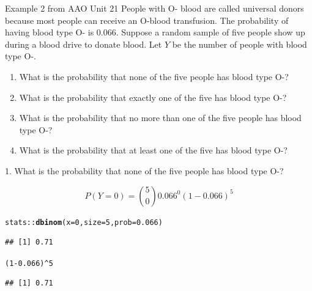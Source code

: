\documentclass[10pt,handout]{beamer}\usepackage[]{graphicx}\usepackage[]{color}
\makeatletter
\newcommand{\hlnum}[1]{\textcolor[rgb]{0.686,0.059,0.569}{#1}}%
\newcommand{\hlopt}[1]{\textcolor[rgb]{0,0,0}{#1}}%
\newcommand{\hlstd}[1]{\textcolor[rgb]{0.345,0.345,0.345}{#1}}%
\newcommand{\hlkwc}[1]{\textcolor[rgb]{0.333,0.667,0.333}{#1}}%
\newcommand{\hlkwd}[1]{\textcolor[rgb]{0.737,0.353,0.396}{\textbf{#1}}}%
\newenvironment{kframe}{%
 \def\at@end@of@kframe{}%
 \ifinner\ifhmode%
  \def\at@end@of@kframe{\end{minipage}}%
  \begin{minipage}{\columnwidth}%
 \fi\fi%
 \def\FrameCommand##1{\hskip\@totalleftmargin \hskip-\fboxsep
 \colorbox{shadecolor}{##1}\hskip-\fboxsep
     \hskip-\linewidth \hskip-\@totalleftmargin \hskip\columnwidth}%
 \MakeFramed {\advance\hsize-\width
   \@totalleftmargin\z@ \linewidth\hsize
   \@setminipage}}%
 {\par\unskip\endMakeFramed%
 \at@end@of@kframe}
\newenvironment{knitrout}{}{} %
\makeatother
\begin{document}
\begin{frame}{Example 2 from AAO Unit 21}
	People with O- blood are called universal donors because most people can receive an O-blood transfusion. The probability of having blood type O- is 0.066. Suppose a random sample of five people show up during a blood drive to donate blood. Let $Y$ be the number of people with blood type O-.
	
	\begin{enumerate}
		\item What is the probability that none of the five people has blood type O-?
		\item What is the probability that exactly one of the five has blood type O-?
		\item What is the probability that no more than one of the five people has blood type O-?
		\item What is the probability that at least one of the five has blood type O-?
	\end{enumerate}
\end{frame}


\begin{frame}[fragile]{1. What is the probability that none of the five people has blood type O-?}
	
	$$ 
	P(Y = 0) = \binom{5}{0} 0.066^0 (1- 0.066)^5
	$$
	
	
\begin{knitrout}\tiny
{}\color{fgcolor}\begin{kframe}
\begin{alltt}
\hlstd{stats}\hlopt{::}\hlkwd{dbinom}\hlstd{(}\hlkwc{x} \hlstd{=} \hlnum{0}\hlstd{,} \hlkwc{size} \hlstd{=} \hlnum{5}\hlstd{,} \hlkwc{prob} \hlstd{=} \hlnum{0.066}\hlstd{)}
\end{alltt}
\begin{verbatim}
## [1] 0.71
\end{verbatim}
\begin{alltt}
\hlstd{(}\hlnum{1}\hlopt{-}\hlnum{0.066}\hlstd{)}\hlopt{^}\hlnum{5}
\end{alltt}
\begin{verbatim}
## [1] 0.71
\end{verbatim}
\end{kframe}
\end{knitrout}
	
\end{frame}
\end{document}
